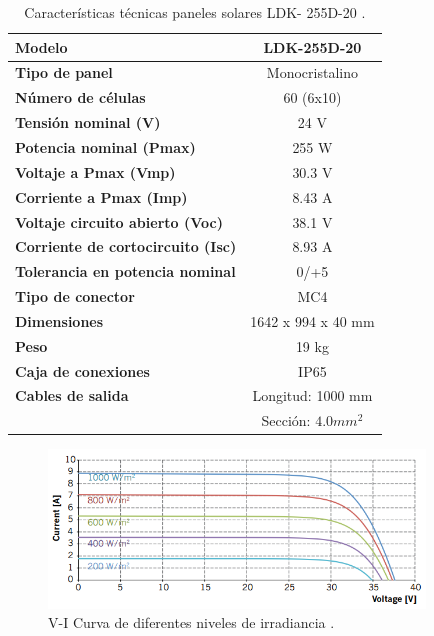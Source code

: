 \begin{table}[H]
	\centering
	\caption{Características técnicas paneles solares LDK- 255D-20 \cite{DDE1}.}
	\begin{tabular}{|l|p{12.93em}|}
		\hline
		\textbf{Modelo} & \multicolumn{1}{c|}{LDK-255D-20} \\
		\hline
		\textbf{Tipo de panel} & \multicolumn{1}{c|}{Monocristalino} \\
		\hline
		\textbf{Número de células } & \multicolumn{1}{c|}{60 (6x10)} \\
		\hline
		\textbf{Tensión nominal (V)} & \multicolumn{1}{c|}{24 V} \\
		\hline
		\textbf{Potencia nominal (Pmax)} & \multicolumn{1}{c|}{255 W} \\
		\hline
		\textbf{Voltaje a Pmax (Vmp)} & \multicolumn{1}{c|}{30.3 V} \\
		\hline
		\textbf{Corriente a Pmax (Imp)} & \multicolumn{1}{c|}{8.43 A} \\
		\hline
		\textbf{Voltaje circuito abierto (Voc)} & \multicolumn{1}{c|}{38.1 V} \\
		\hline
		\textbf{Corriente de cortocircuito (Isc)} & \multicolumn{1}{c|}{8.93 A} \\
		\hline
		\textbf{Tolerancia en potencia nominal} & \multicolumn{1}{c|}{0/+5} \\
		\hline
		\textbf{Tipo de conector} & \multicolumn{1}{c|}{MC4} \\
		\hline
		\textbf{Dimensiones} & \multicolumn{1}{c|}{1642 x 994 x 40 mm} \\
		\hline
		\textbf{Peso} & \multicolumn{1}{c|}{19 kg} \\
		\hline
		\textbf{Caja de conexiones} & \multicolumn{1}{c|}{IP65} \\
		\hline
		\textbf{Cables de salida } & \multicolumn{1}{c|}{Longitud: 1000 mm} \\
		\textbf{} & \multicolumn{1}{c|}{Sección: $ 4.0 mm^2 $ } \\
		\hline
	\end{tabular}%
	\label{tab:tabla_LDK}%
\end{table}%

\begin{figure}[H]
	\centering
	\includegraphics[width=10cm]{imagenes/VIpaneles}
	\caption{V-I Curva de diferentes niveles de irradiancia \cite{DDE1}.}
	\label{fig:VIcurva}
\end{figure}


